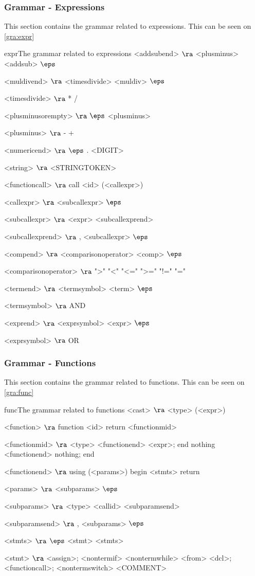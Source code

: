 \subsubsection{Grammar - Expressions}
This section contains the grammar related to expressions. This can be seen on \ref{gra:expr}
\begin{grammatik}{expr}{The grammar related to expressions}
<addsubend> $\ra$ <plusminus> <addsub>
\alt $\eps$

<muldivend> $\ra$ <timesdivide> <muldiv>
\alt $\eps$

<timesdivide> $\ra$ *
\alt /

<plusminusorempty> $\ra$ $\eps$
\alt <plusminus>

<plusminus> $\ra$ - 
\alt +

<numericend> $\ra$ $\eps$
\alt . <DIGIT>

<string> $\ra$ <STRINGTOKEN>

<functioncall> $\ra$ call <id> (<callexpr>)

<callexpr> $\ra$ <subcallexpr>
\alt$\eps$

<subcallexpr> $\ra$ <expr> <subcallexprend>

<subcallexprend> $\ra$ , <subcallexpr>
\alt$\eps$

<compend> $\ra$ <comparisonoperator> <comp>
\alt$\eps$

<comparisonoperator> $\ra$ ">"
				\alt "<"
				\alt "<="
				\alt ">="
				\alt "!="
				\alt "="

<termend> $\ra$ <termsymbol> <term>
\alt$\eps$

<termsymbol> $\ra$ AND 

<exprend> $\ra$ <exprsymbol> <expr>
\alt$\eps$

<exprsymbol> $\ra$ OR 
\end{grammatik}

\subsubsection{Grammar - Functions}
This section contains the grammar related to functions. This can be seen on \ref{gra:func}
\begin{grammatik}{func}{The grammar related to functions}
<cast> $\ra$ <type> (<expr>)

<function> $\ra$ function <id> return <functionmid>

<functionmid> $\ra$ <type> <functionend> <expr>; end
\alt nothing <functionend> nothing; end

<functionend> $\ra$
using (<params>)
begin
	<stmts>
	return

<params> $\ra$ <subparams>
	\alt$\eps$

<subparams> $\ra$ <type> <callid> <subparamsend>

<subparamsend> $\ra$ , <subparams>
\alt$\eps$

<stmts> $\ra$ $\eps$
	\alt <stmt> <stmts>

<stmt> $\ra$ <assign>;
	\alt <nontermif>
	\alt <nontermwhile>
	\alt <from>
	\alt <dcl>;
	\alt <functioncall>;
	\alt <nontermswitch>
	\alt <COMMENT>
\end{grammatik}

